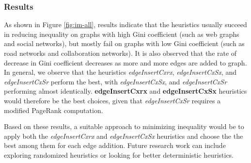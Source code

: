 \subsubsection{Results}

As shown in Figure \ref{fig:im-all}, results indicate that the heuristics usually succeed in reducing inequality on graphs with high Gini coefficient (such as web graphs and social networks), but mostly fail on graphs with low Gini coefficient (such as road networks and collaboration networks). It is also observed that the rate of decrease in Gini coefficient decreases as more and more edges are added to graph. In general, we observe that the heuristics \textit{edgeInsertCxrx}, \textit{edgeInsertCxSx}, and \textit{edgeInsertCxSr} perform the best, with \textit{edgeInsertCxSx}, and \textit{edgeInsertCxSr} performing almost identically. \textbf{edgeInsertCxrx} and \textbf{edgeInsertCxSx} heuristics would therefore be the best choices, given that \textit{edgeInsertCxSr} requires a modified PageRank computation.

Based on these results, a suitable approach to minimizing inequality would be to apply both the \textit{edgeInsertCxrx} and \textit{edgeInsertCxSx} heuristics and choose the the best among them for each edge addition. Future research work can include exploring randomized heuristics or looking for better deterministic heuristics.


